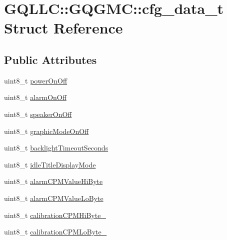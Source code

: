 \hypertarget{struct_g_q_l_l_c_1_1_g_q_g_m_c_1_1cfg__data__t}{\section{\-G\-Q\-L\-L\-C\-:\-:\-G\-Q\-G\-M\-C\-:\-:cfg\-\_\-data\-\_\-t \-Struct \-Reference}
\label{struct_g_q_l_l_c_1_1_g_q_g_m_c_1_1cfg__data__t}
}
\subsection*{\-Public \-Attributes}
\begin{DoxyCompactItemize}
\item 
uint8\-\_\-t \hyperlink{struct_g_q_l_l_c_1_1_g_q_g_m_c_1_1cfg__data__t_aa7ec4eac72769d371a0b40d40ea15317}{power\-On\-Off}
\item 
uint8\-\_\-t \hyperlink{struct_g_q_l_l_c_1_1_g_q_g_m_c_1_1cfg__data__t_aa7b652504cb3514629123e8a2cb6d30b}{alarm\-On\-Off}
\item 
uint8\-\_\-t \hyperlink{struct_g_q_l_l_c_1_1_g_q_g_m_c_1_1cfg__data__t_a383c67346e7a01be93d289fbb6f9251e}{speaker\-On\-Off}
\item 
uint8\-\_\-t \hyperlink{struct_g_q_l_l_c_1_1_g_q_g_m_c_1_1cfg__data__t_af5a01400ca680250156db36f680d777d}{graphic\-Mode\-On\-Off}
\item 
uint8\-\_\-t \hyperlink{struct_g_q_l_l_c_1_1_g_q_g_m_c_1_1cfg__data__t_afd9b297b6de00a041fb939ca000bc2bc}{backlight\-Timeout\-Seconds}
\item 
uint8\-\_\-t \hyperlink{struct_g_q_l_l_c_1_1_g_q_g_m_c_1_1cfg__data__t_a63e1547bd87c16b035ddf9e9ce0fb119}{idle\-Title\-Display\-Mode}
\item 
uint8\-\_\-t \hyperlink{struct_g_q_l_l_c_1_1_g_q_g_m_c_1_1cfg__data__t_aaa2ec19edde5bb6129275953af9b142f}{alarm\-C\-P\-M\-Value\-Hi\-Byte}
\item 
uint8\-\_\-t \hyperlink{struct_g_q_l_l_c_1_1_g_q_g_m_c_1_1cfg__data__t_a5c370ccb42d0fb861b70f0e7923ca3a3}{alarm\-C\-P\-M\-Value\-Lo\-Byte}
\item 
uint8\-\_\-t \hyperlink{struct_g_q_l_l_c_1_1_g_q_g_m_c_1_1cfg__data__t_af59d42402109546c8e582b17834a7f7f}{calibration\-C\-P\-M\-Hi\-Byte\-\_}
\item 
uint8\-\_\-t \hyperlink{struct_g_q_l_l_c_1_1_g_q_g_m_c_1_1cfg__data__t_a406ee5f3fe28ce49f0776c7ccfc570e4}{calibration\-C\-P\-M\-Lo\-Byte\-\_}
\item 

\end{DoxyCompactItemize}
